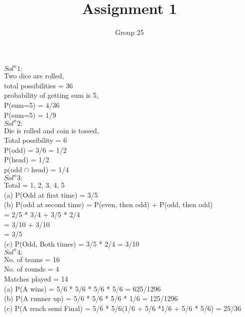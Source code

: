 \documentclass{article}
\title{Assignment 1}
\author{Group 25}
\begin{document}
\maketitle

\textbf{$Sol^n 1:$} \\

Two dice are rolled, \\
total possibilities = 36 \\
probability of getting sum is 5, \\
P(sum=5) = 4/36 \\
P(sum=5) = 1/9 \\

\textbf{$Sol^n 2:$} \\

Die is rolled and coin is tossed, \\
 Total possibility = 6 \\
P(odd) = 3/6 = 1/2 \\
P(head) = 1/2 \\
p(odd $\cap$ head) = 1/4 \\

\textbf{$Sol^n 3:$} \\

Total = 1, 2, 3, 4, 5 \\

(a) P(Odd at first time) = 3/5 \\

(b) P(odd at second time) = P(even, then odd) + P(odd, then odd) \\
= 2/5 * 3/4 + 3/5 * 2/4 \\
= 3/10 + 3/10 \\
= 3/5 \\

(c) P(Odd, Both times) = 3/5 * 2/4 = 3/10 \\

\textbf{$Sol^n 4:$} \\

No. of teams  = 16 \\
No. of rounds = 4 \\
Matches played = 14 \\

(a) P(A wins) = 5/6 * 5/6 * 5/6 * 5/6 = 625/1296 \\

(b) P(A runner up) = 5/6 * 5/6 * 5/6 * 1/6 = 125/1296 \\

(c) P(A reach semi Final) = 5/6 * 5/6(1/6 + 5/6 *1/6 + 5/6 * 5/6) = 25/36 \\
\end{document}
